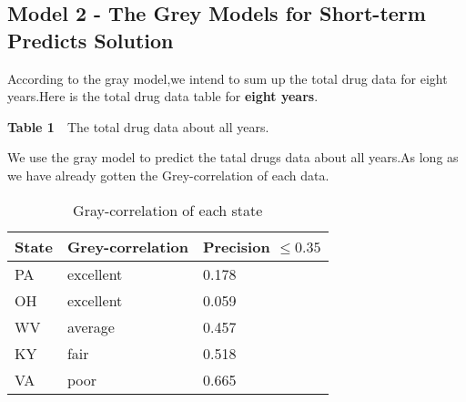 \documentclass{mcmthesis}
\begin{document}
\subsection{Model 2 - The Grey Models for Short-term Predicts Solution}%
\noindent According to the gray model,we intend to sum up the total drug data for eight years.Here is the total drug data table for \textbf{eight years}.\\%
\begin{center}
	\textbf{Table 1}~~The total drug data about all years.\\%
\end{center}
\noindent We use the gray model to predict the tatal drugs data about all years.As long as we have already gotten the Grey-correlation of each data.\\%
\begin{table}[htbp]
	\centering
    \caption{Gray-correlation of each state} %
	\begin{tabular}{p{4cm}p{4cm}p{4cm}}\toprule 
		State & Grey-correlation & Precision $ \le 0.35$\\ \midrule 
		PA & excellent & 0.178 \\
		OH & excellent & 0.059\\ 
		WV & average & 0.457\\
		KY & fair & 0.518\\
		VA & poor & 0.665\\
		\bottomrule
	\end{tabular} 
\end{table}
\end{document}
